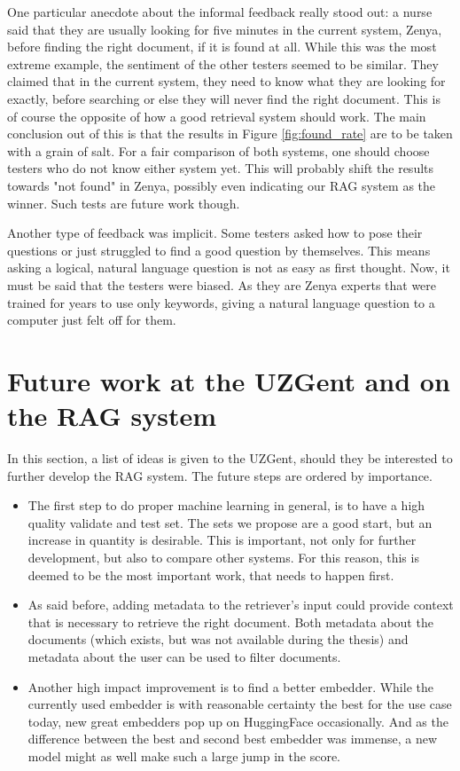One particular anecdote about the informal feedback really stood out: a nurse said that they are usually looking for five minutes in the current system, Zenya, before finding the right document, if it is found at all. While this was the most extreme example, the sentiment of the other testers seemed to be similar. They claimed that in the current system, they need to know what they are looking for exactly, before searching or else they will never find the right document. This is of course the opposite of how a good retrieval system should work. The main conclusion out of this is that the results in Figure \ref{fig:found_rate} are to be taken with a grain of salt. For a fair comparison of both systems, one should choose testers who do not know either system yet. This will probably shift the results towards "not found" in Zenya, possibly even indicating our RAG system as the winner. Such tests are future work though.

Another type of feedback was implicit. Some testers asked how to pose their questions or just struggled to find a good question by themselves. This means asking a logical, natural language question is not as easy as first thought. Now, it must be said that the testers were biased. As they are Zenya experts that were trained for years to use only keywords, giving a natural language question to a computer just felt off for them.

\section{Future work at the UZGent and on the RAG system}
In this section, a list of ideas is given to the UZGent, should they be interested to further develop the RAG system. The future steps are ordered by importance.

\begin{itemize}
    \item The first step to do proper machine learning in general, is to have a high quality validate and test set. The sets we propose are a good start, but an increase in quantity is desirable. This is important, not only for further development, but also to compare other systems. For this reason, this is deemed to be the most important work, that needs to happen first. 
    \item As said before, adding metadata to the retriever's input could provide context that is necessary to retrieve the right document. Both metadata about the documents (which exists, but was not available during the thesis) and metadata about the user can be used to filter documents. 
    \item Another high impact improvement is to find a better embedder. While the currently used embedder is with reasonable certainty the best for the use case today, new great embedders pop up on HuggingFace occasionally. And as the difference between the best and second best embedder was immense, a new model might as well make such a large jump in the score.
\end{itemize}

